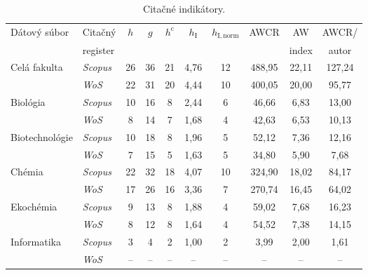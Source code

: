 \begin{table}
\centering\small
\begin{tabular}{llcccccccc}
  \hline\noalign{\vspace{.3ex}}
  Dátový súbor & Citačný  & $h$ & $g$ & $h^{\mathrm{c}}$ & $h_{\mathrm{I}}$ & $h_{\mathrm{I, norm}}$ & AWCR & AW    & AWCR/ \\
               & register &     &     &               &               &                   &       & index & autor \\[0.3ex]
  \hline\noalign{\vspace{.5ex}}
  Celá fakulta   & \emph{Scopus} & 26 & 36 & 21 & 4,76 & 12 & 488,95 & 22,11 & 127,24 \\
                 & \emph{WoS}    & 22 & 31 & 20 & 4,44 & 10 & 400,05 & 20,00 &  95,77 \\[1ex]
  Biológia       & \emph{Scopus} & 10 & 16 &  8 & 2,44 &  6 &  46,66 &  6,83 &  13,00 \\
                 & \emph{WoS}    &  8 & 14 &  7 & 1,68 &  4 &  42,63 &  6,53 &  10,13 \\[1ex]
  Biotechnológie & \emph{Scopus} & 10 & 18 &  8 & 1,96 &  5 &  52,12 &  7,36 &  12,16 \\
                 & \emph{WoS}    &  7 & 15 &  5 & 1,63 &  5 &  34,80 &  5,90 &   7,68 \\[1ex]
  Chémia         & \emph{Scopus} & 22 & 32 & 18 & 4,07 & 10 & 324,90 & 18,02 &  84,17 \\
                 & \emph{WoS}    & 17 & 26 & 16 & 3,36 &  7 & 270,74 & 16,45 &  64,02 \\[1ex]
  Ekochémia      & \emph{Scopus} &  9 & 13 &  8 & 1,88 &  4 &  59,02 &  7,68 &  16,23 \\
                 & \emph{WoS}    &  8 & 12 &  8 & 1,64 &  4 &  54,52 &  7,38 &  14,15 \\[1ex]
  Informatika    & \emph{Scopus} &  3 &  4 &  2 & 1,00 &  2 &   3,99 &  2,00 &   1,61 \\
                 & \emph{WoS}    & -- & -- & -- &  --  & -- &  --    & --    &  --    \\[0.5ex]
  \hline
\end{tabular}
\caption{Citačné indikátory.}
\label{tab:citation.indicators}
\end{table}

